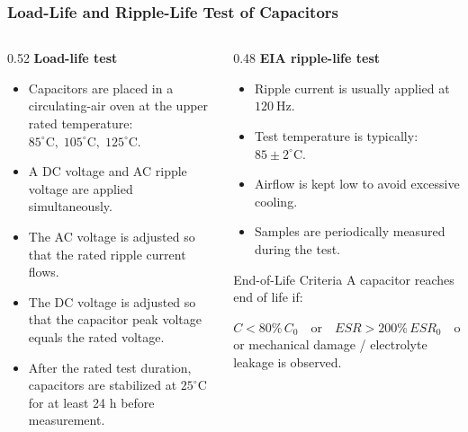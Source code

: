 \begin{frame}
\frametitle{Load-Life and Ripple-Life Test of Capacitors}

\begin{columns}
\begin{column}{0.52\textwidth}
\textbf{Load-life test}
\begin{itemize}
    \item Capacitors are placed in a circulating-air oven at the upper rated temperature: $85^\circ\mathrm{C},\;105^\circ\mathrm{C},\;125^\circ\mathrm{C}$.
    \item A DC voltage and AC ripple voltage are applied simultaneously.
    \item The AC voltage is adjusted so that the rated ripple current flows.
    \item The DC voltage is adjusted so that the capacitor peak voltage equals the rated voltage.
    \item After the rated test duration, capacitors are stabilized at \(25^\circ\mathrm{C}\) for at least 24 h before measurement.
\end{itemize}
\end{column}

\begin{column}{0.48\textwidth}
\textbf{EIA ripple-life test}
\begin{itemize}
    \item Ripple current is usually applied at \(120~\si{\hertz}\).
    \item Test temperature is typically: $85 \pm 2^\circ\mathrm{C}$.
    \item Airflow is kept low to avoid excessive cooling.
    \item Samples are periodically measured during the test.
\end{itemize}
\begin{block}{End-of-Life Criteria}
\small
A capacitor reaches end of life if: 

$C < 80\%\,C_0 \quad \text{or}  \quad ESR > 200\%\,ESR_0  \quad \text{or}  \quad DCL > DCL_0$ or mechanical damage / electrolyte leakage is observed.
\end{block}
\end{column}
\end{columns}


\end{frame}

